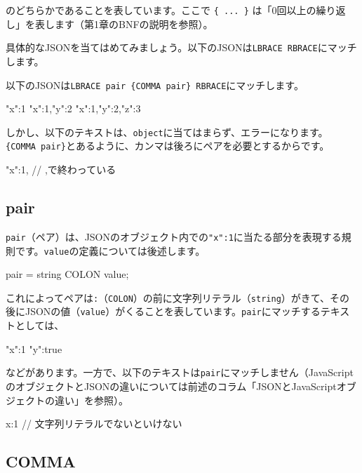 \noindent のどちらかであることを表しています。ここで \texttt{\{\ ...\ \}}
は「0回以上の繰り返し」を表します（第1章のBNFの説明を参照）。

具体的なJSONを当てはめてみましょう。以下のJSONは\texttt{LBRACE\ RBRACE}にマッチします。

\begin{codescreen}{}
{}
\end{codescreen}


以下のJSONは\texttt{LBRACE\ pair\ \{COMMA\ pair\}\ RBRACE}にマッチします。

\begin{codescreen}{}
{"x":1}
{"x":1,"y":2}
{"x":1,"y":2,"z":3}
\end{codescreen}


しかし、以下のテキストは、\texttt{object}に当てはまらず、エラーになります。\texttt{\{COMMA\ pair\}}とあるように、カンマは後ろにペアを必要とするからです。

\begin{codescreen}{}
{"x":1,} // ,で終わっている
\end{codescreen}

\subsection{pair}

\texttt{pair}（ペア）は、JSONのオブジェクト内での\texttt{"x":1}に当たる部分を表現する規則です。\texttt{value}の定義については後述します。

\begin{codescreen}{}
pair = string COLON value;
\end{codescreen}

これによってペアは\texttt{:}（\texttt{COLON}）の前に文字列リテラル（\texttt{string}）がきて、その後にJSONの値（\texttt{value}）がくることを表しています。\texttt{pair}にマッチするテキストとしては、

\begin{codescreen}{}
"x":1
"y":true
\end{codescreen}

\noindent などがあります。一方で、以下のテキストは\texttt{pair}にマッチしません（JavaScriptのオブジェクトとJSONの違いについては前述のコラム「JSONとJavaScriptオブジェクトの違い」を参照）。

\begin{codescreen}{}
x:1 // 文字列リテラルでないといけない
\end{codescreen}

\subsection{COMMA}

